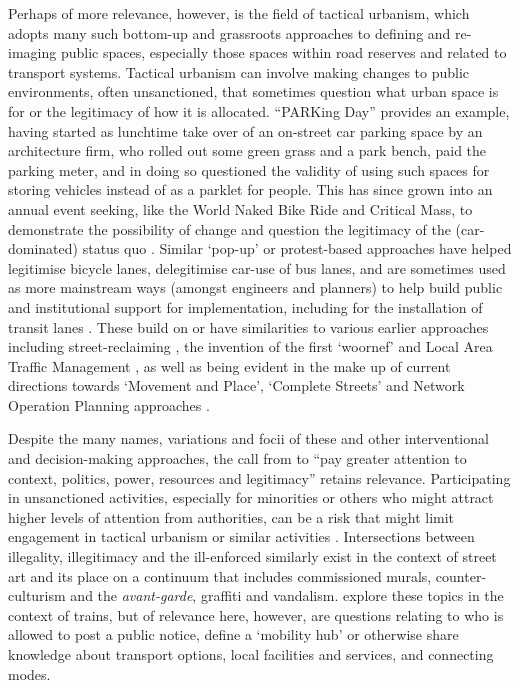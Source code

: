 \documentclass[preprint, 3p,
authoryear]{elsarticle} %
\begin{document}
Perhaps of more relevance, however, is the field of tactical urbanism,
which adopts many such bottom-up and grassroots approaches to defining
and re-imaging public spaces, especially those spaces within road
reserves and related to transport systems. Tactical urbanism can involve
making changes to public environments, often unsanctioned, that
sometimes question what urban space is for or the legitimacy of how it
is allocated. ``PARKing Day'' provides an example, having started as
lunchtime take over of an on-street car parking space by an architecture
firm, who rolled out some green grass and a park bench, paid the parking
meter, and in doing so questioned the validity of using such spaces for
storing vehicles instead of as a parklet for people. This has since
grown into an annual event seeking, like the World Naked Bike Ride and
Critical Mass, to demonstrate the possibility of change and question the
legitimacy of the (car-dominated) status quo
\citep{Lydon:2012aa,Davidson:2013aa,Lydon:2015aa,Blumgart:2016ab, Ride:2009aa, Morhayim:2012aa, Longhurst:2015aa}.
Similar `pop-up' or protest-based approaches have helped legitimise
bicycle lanes, delegitimise car-use of bus lanes, and are sometimes used
as more mainstream ways (amongst engineers and planners) to help build
public and institutional support for implementation, including for the
installation of transit lanes
\citep{Fucoloro:2013aa,News:2019ab, TransitCenter:2018ab, Transportation-Studies:2019aa}.
These build on or have similarities to various earlier approaches
including street-reclaiming
\citep{Dobson:2023ae,Engwicht:1999aa,Fotel:2009aa,Institute:2015aa}, the
invention of the first `woornef' \citep{Guttenberg:1982aa, Lydon:2015aa}
and Local Area Traffic Management \citep{Damen:2017aa}, as well as being
evident in the make up of current directions towards `Movement and
Place', `Complete Streets' and Network Operation Planning approaches
\citep{Delbosc:2018aa}.

Despite the many names, variations and focii of these and other
interventional and decision-making approaches, the call from
\citet{Marsden:2017aa} to ``pay greater attention to context, politics,
power, resources and legitimacy'' retains relevance. Participating in
unsanctioned activities, especially for minorities or others who might
attract higher levels of attention from authorities, can be a risk that
might limit engagement in tactical urbanism or similar activities
\citep{Douglas:2018aa}. Intersections between illegality, illegitimacy
and the ill-enforced similarly exist in the context of street art and
its place on a continuum that includes commissioned murals,
counter-culturism and the \emph{avant-garde}, graffiti and vandalism.
\citet{Killen:2017aa,Killen:2021aa} explore these topics in the context
of trains, but of relevance here, however, are questions relating to who
is allowed to post a public notice, define a `mobility hub' or otherwise
share knowledge about transport options, local facilities and services,
and connecting modes.
\end{document}
